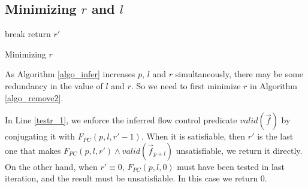 \documentclass[conference]{IEEEtran}
\begin{document}
\subsection{Minimizing $r$ and $l$}\label{reduceing}

\begin{algorithm}[t]
\SetAlgoVlined
{} {
   {
    break
  }
}
return $r'$
\caption{Minimizing $r$}
\label{algo_remove2}
\end{algorithm}

As Algorithm \ref{algo_infer} increases $p$, $l$ and $r$ simultaneously,
there may be some redundancy in the value of $l$ and $r$.
So we need to first minimize $r$ in Algorithm \ref{algo_remove2}.


In Line \ref{testr_1},
we enforce the inferred flow control predicate $valid(\vec{f})$ by
conjugating it with $F_{PC}(p,l,r'-1)$.
When it is satisfiable,
then $r'$ is the last one that makes $F_{PC}(p,l,r')\wedge valid(\vec{f}_{p+l})$ unsatisfiable,
we return it directly.
On the other hand,
when $r'\equiv 0$,
$F_{PC}(p,l,0)$ must have been tested in last iteration,
and the result must be unsatisfiable.
In this case we return $0$.

% 
% 
\end{document}
